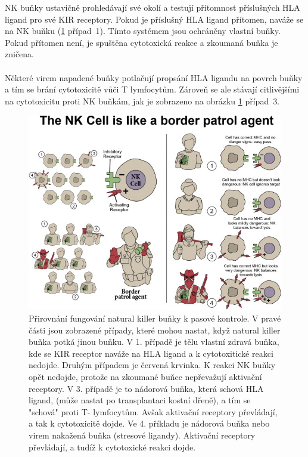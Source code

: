 \documentclass[czech,DP]{thesiskiv}
\numberwithin{equation}{section}
\begin{document}
\noindent
NK buňky ustavičně prohledávají své okolí a testují přítomnost příslušných HLA ligand pro své KIR receptory. Pokud je příslušný HLA ligand přítomen, naváže se na NK buňku (\ref{fig:kir_princip} případ~1). Tímto systémem jsou ochráněny vlastní buňky. Pokud přítomen není, je spuštěna cytotoxická reakce a zkoumaná buňka je zničena.
\\
\\
Některé virem napadené buňky potlačují propsání HLA ligandu na povrch buňky a tím se brání cytotoxicitě vůči T lymfocytům. Zároveň se ale stávají citlivějšími na cytotoxicitu proti NK buňkám, jak je zobrazeno na obrázku \ref{fig:kir_princip} případ~3.
\begin{figure}[H]		
		\centering
		\includegraphics[width=\textwidth]{./img/NK_princip.jpg}
		\caption{Přirovnání fungování natural killer buňky k pasové kontrole. V pravé části jsou zobrazené případy, které mohou nastat, když natural killer buňka potká jinou buňku. V 1. případě je tělu vlastní zdravá buňka, kde se KIR receptor naváže na HLA ligand a k cytotoxitické reakci nedojde. Druhým případem je červená krvinka. K reakci NK buňky opět nedojde, protože na zkoumané buňce nepřevažují aktivační receptory. V 3. případě je to nádorová buňka, která schová HLA ligand, (může nastat po transplantaci kostní dřeně), a tím se "schová" proti T- lymfocytům. Avšak aktivační receptory převládají, a tak k cytotoxicitě dojde. Ve 4. příkladu je nádorová buňka nebo virem nakažená buňka (stresové ligandy). Aktivační receptory převládají, a tudíž k cytotoxické reakci dojde.\cite{KIR_img_princip}}
		\label{fig:kir_princip}
\end{figure}
\end{document}
